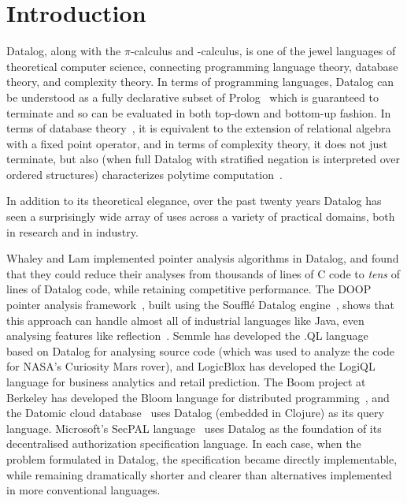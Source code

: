 \section{Introduction}
\label{sec:intro}

Datalog, along with the $\pi$-calculus and \fn-calculus, is one of the jewel
languages of theoretical computer science, connecting programming language
theory, database theory, and complexity theory. In terms of programming
languages, Datalog can be understood as a fully declarative subset of
Prolog~\cite{datalog-from-prolog} which is guaranteed to terminate and so can be
evaluated in both top-down and bottom-up fashion. In terms of database
theory~\cite{datalog-relalg}, it is equivalent to the extension of relational
algebra with a fixed point operator, and in terms of complexity theory, it does
not just terminate, but also (when full Datalog with stratified negation is
interpreted over ordered structures) characterizes polytime
computation~\cite{datalog-polytime}.

In addition to its theoretical elegance, over the past twenty years
Datalog has seen a surprisingly wide array of uses across a variety of
practical domains, both in research and in industry.

Whaley and Lam \cite{whaley-lam,whaley-phd} implemented pointer
analysis algorithms in Datalog, and found that they could reduce their
analyses from thousands of lines of C code to \emph{tens} of lines of
Datalog code, while retaining competitive performance. The DOOP
pointer analysis framework~\cite{doop}, built using the Souffl\'{e}
Datalog engine~\cite{souffle}, shows that this approach can handle
almost all of industrial languages like Java, even analysing features
like reflection~\cite{doop-java-reflection}. Semmle has developed the
.QL language~\cite{semmlecode,ql-inference} based on Datalog for
analysing source code (which was used to analyze the code for NASA's
Curiosity Mars rover), and LogicBlox has developed the
LogiQL~\cite{logicblox} language for business analytics and retail
prediction. The Boom project at Berkeley has developed the Bloom
language for distributed programming~\cite{bloom}, and the Datomic
cloud database~\cite{datomic} uses Datalog (embedded in Clojure) as
its query language. Microsoft's SecPAL language~\cite{secpal} uses
Datalog as the foundation of its decentralised authorization
specification language. In each case, when the problem formulated in
Datalog, the specification became directly implementable, while
remaining dramatically shorter and clearer than alternatives
implemented in more conventional languages.

